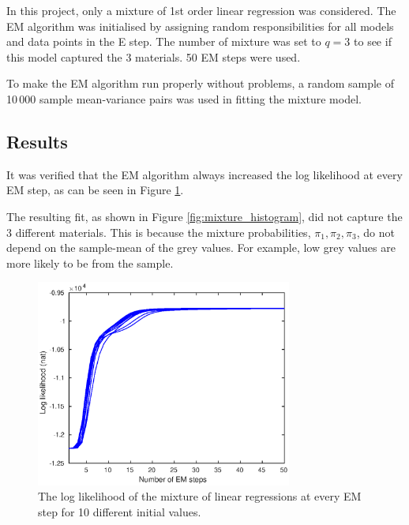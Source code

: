 \documentclass[12pt]{report}
\begin{document}
In this project, only a mixture of 1st order linear regression was considered. The EM algorithm was initialised by assigning random responsibilities for all models and data points in the E step. The number of mixture was set to $q=3$ to see if this model captured the 3 materials. 50 EM steps were used.

To make the EM algorithm run properly without problems, a random sample of 10\,000 sample mean-variance pairs was used in fitting the mixture model.

\subsection{Results}
It was verified that the EM algorithm always increased the log likelihood at every EM step, as can be seen in Figure \ref{fig:mixture_lnL}.

The resulting fit, as shown in Figure \ref{fig:mixture_histogram}, did not capture the 3 different materials. This is because the mixture probabilities, $\pi_1,\pi_2,\pi_3$, do not depend on the sample-mean of the grey values. For example, low grey values are more likely to be from the sample.

\begin{figure}
	\centering	
	\includegraphics[width=0.75\textwidth]{figures/meanVar/mixture_lnL.eps}
	\caption{The log likelihood of the mixture of linear regressions at every EM step for 10 different initial values.}
	\label{fig:mixture_lnL}
\end{figure}
\end{document}
